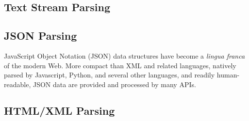\subsection{Text Stream Parsing}

\subsection{JSON Parsing}

JavaScript Object Notation (JSON) data structures have become a \emph{lingua franca} of the modern Web.  More compact than XML and related languages, natively parsed by Javascript, Python, and several other languages, and readily human-readable, JSON data are provided and processed by many APIs.



\subsection{HTML/XML Parsing}
